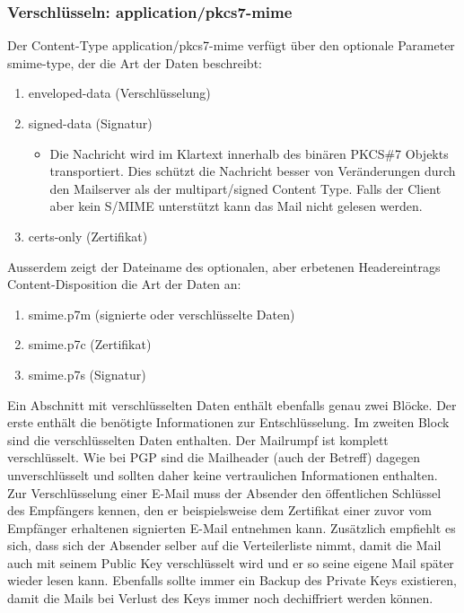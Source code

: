 \subsubsection{Verschlüsseln: application/pkcs7-mime}
Der Content-Type application/pkcs7-mime verfügt über den optionale Parameter smime-type, der die Art der Daten beschreibt:
\begin{enumerate}
	\item enveloped-data (Verschlüsselung)
	\item signed-data (Signatur)
	\begin{itemize}
		\item Die Nachricht wird im Klartext innerhalb des binären PKCS\#7 Objekts transportiert. Dies schützt die Nachricht besser von Veränderungen durch den Mailserver als der multipart/signed Content Type. Falls der Client aber kein S/MIME unterstützt kann das Mail nicht gelesen werden.
	\end{itemize}
	\item certs-only (Zertifikat)
\end{enumerate}
Ausserdem zeigt der Dateiname des optionalen, aber erbetenen Headereintrags Content-Disposition die Art der Daten an:
\begin{enumerate}
	\item smime.p7m (signierte oder verschlüsselte Daten)
	\item smime.p7c (Zertifikat)
	\item smime.p7s (Signatur)
\end{enumerate}
Ein Abschnitt mit verschlüsselten Daten enthält ebenfalls genau zwei Blöcke. Der erste enthält die benötigte Informationen zur Entschlüsselung. Im zweiten Block sind die verschlüsselten Daten enthalten. Der Mailrumpf ist komplett verschlüsselt. Wie bei PGP sind die Mailheader (auch der Betreff) dagegen unverschlüsselt und sollten daher keine vertraulichen Informationen enthalten. Zur Verschlüsselung einer E-Mail muss der Absender den öffentlichen Schlüssel des Empfängers kennen, den er beispielsweise dem Zertifikat einer zuvor vom Empfänger erhaltenen signierten E-Mail entnehmen kann. Zusätzlich empfiehlt es sich, dass sich der Absender selber auf die Verteilerliste nimmt, damit die Mail auch mit seinem Public Key verschlüsselt wird und er so seine eigene Mail später wieder lesen kann. Ebenfalls sollte immer ein Backup des Private Keys existieren, damit die Mails bei Verlust des Keys immer noch dechiffriert werden können.


